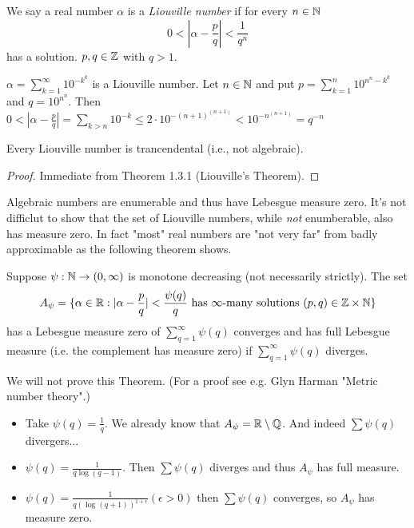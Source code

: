 \documentclass[NumTh.tex]{subfiles}
\begin{document}
We say a real number $\alpha$ is a \emph{Liouville number} if for every $n \in \mathbb{N}$
\[ 0 < |\alpha - \frac{p}{q}| < \frac{1}{q^n} \]
has a solution. $p,q \in \mathbb{Z}$ with $q > 1$.

\begin{ex}
  $\alpha = \sum_{k = 1}^\infty 10^{-k^k}$ is a Liouville number.
  Let $n \in\mathbb{N}$ and put $p = \sum_{k=1}^n 10^{n^n - k^k}$ and $q = 10^{n^n}$.
  Then $ 0 < |\alpha - \frac{p}{q}| = \sum_{k>n} 10^{-k} \leq 2\cdot 10^{-(n+1)^{(n+1)}} < 10^{-n^{(n+1)}} = q^{-n}$
\end{ex}

\begin{cor}[1.3.2]
  Every Liouville number is trancendental (i.e., not algebraic).
\end{cor}

\begin{proof}
  Immediate from Theorem 1.3.1 (Liouville's Theorem).
\end{proof}

  Algebraic numbers are enumerable and thus have Lebesgue measure zero.
  It's not difficlut to show that the set of Liouville numbers, while \emph{not} enumberable, also has measure zero.
  In fact "most" real numbers are "not very far" from badly approximable as the following theorem shows.

\begin{theorem}[Khintchine]
  Suppose $\psi: \mathbb{N} \to (0,\infty)$ is monotone decreasing (not necessarily strictly).
  The set 
  \[A_\psi = \{\alpha \in \mathbb{R}: |\alpha - \frac{p}{q}| < \frac{\psi(q)}{q} \text{ has $\infty$-many solutions } (p,q) \in \mathbb{Z} \times \mathbb{N} \} \]
  has a Lebesgue measure zero of $\sum_{q=1}^\infty \psi(q)$ converges and has full Lebesgue measure (i.e. the complement has measure zero) 
  if $\sum_{q=1}^\infty \psi(q)$ diverges.
\end{theorem}

We will not prove this Theorem. (For a proof see e.g. Glyn Harman "Metric number theory".)

\begin{ex}
  \begin{itemize}
    \item Take $\psi(q) = \frac{1}{q}$. We already know that $A_\psi = \mathbb{R} \setminus \mathbb{Q}$.
    And indeed $\sum \psi(q)$ divergers...
    \item $\psi(q) = \frac{1}{q \log(q-1)}$. Then $\sum \psi(q)$ diverges and thus $A_\psi$ has full measure.
    \item $\psi(q) = \frac{1}{q (\log(q+1))^{1+\epsilon}} (\epsilon > 0)$ then $\sum \psi(q)$ converges,
    so $A_\psi$ has measure zero.
  \end{itemize}
\end{ex}
\end{document}
